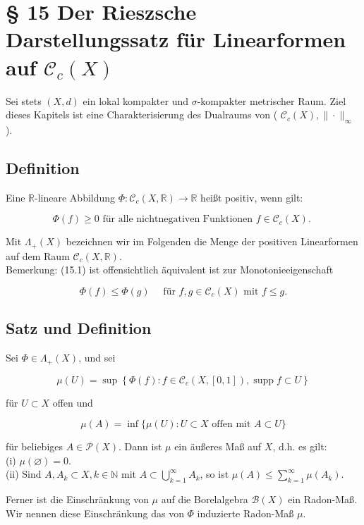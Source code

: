 \documentclass[10pt, letterpaper]{article}
\begin{document}
\section*{§ 15 Der Rieszsche Darstellungssatz für Linearformen auf $\mathcal{C}_{c}(X)$}
Sei stets $(X, d)$ ein lokal kompakter und $\sigma$-kompakter metrischer Raum. Ziel dieses Kapitels ist eine Charakterisierung des Dualraums von ( $\mathcal{C}_{c}(X),\|\cdot\|_{\infty}$ ).

\subsection*{Definition}
Eine $\mathbb{R}$-lineare Abbildung $\Phi: \mathcal{C}_{c}(X, \mathbb{R}) \rightarrow \mathbb{R}$ heißt positiv, wenn gilt:

$$
\Phi(f) \geq 0 \text { für alle nichtnegativen Funktionen } f \in \mathcal{C}_{c}(X) \text {. }
$$

Mit $\Lambda_{+}(X)$ bezeichnen wir im Folgenden die Menge der positiven Linearformen auf dem Raum $\mathcal{C}_{c}(X, \mathbb{R})$.\\
Bemerkung: (15.1) ist offensichtlich äquivalent ist zur Monotonieeigenschaft

$$
\Phi(f) \leq \Phi(g) \quad \text { für } f, g \in \mathcal{C}_{c}(X) \text { mit } f \leq g .
$$

\subsection*{Satz und Definition}
Sei $\Phi \in \Lambda_{+}(X)$, und sei

$$
\mu(U)=\sup \left\{\Phi(f): f \in \mathcal{C}_{c}(X,[0,1]), \operatorname{supp} f \subset U\right\}
$$

für $U \subset X$ offen und

$$
\mu(A)=\inf \{\mu(U): U \subset X \text { offen mit } A \subset U\}
$$

für beliebiges $A \in \mathcal{P}(X)$. Dann ist $\mu$ ein äußeres Maß auf $X$, d.h. es gilt:\\
(i) $\mu(\varnothing)=0$.\\
(ii) Sind $A, A_{k} \subset X, k \in \mathbb{N}$ mit $A \subset \bigcup_{k=1}^{\infty} A_{k}$, so ist $\mu(A) \leq \sum_{k=1}^{\infty} \mu\left(A_{k}\right)$.

Ferner ist die Einschränkung von $\mu$ auf die Borelalgebra $\mathcal{B}(X)$ ein Radon-Maß. Wir nennen diese Einschränkung das von $\Phi$ induzierte Radon-Maß $\mu$.
\end{document}
